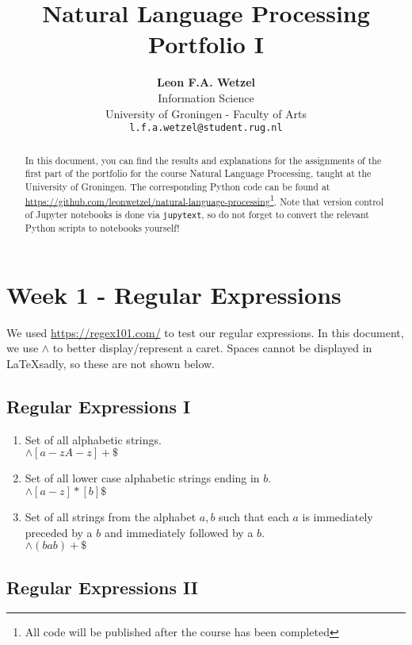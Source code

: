 \documentclass[a4paper, 11pt]{article}
\title{\textbf{Natural Language Processing}\\Portfolio I}
\author{\textbf{Leon F.A. Wetzel}\\ Information Science \\ University of Groningen - Faculty of Arts\\ \texttt{l.f.a.wetzel@student.rug.nl}}
\begin{document}
\maketitle

\begin{abstract}
	
	In this document, you can find the results and explanations for the assignments of the first part of the portfolio for the course Natural Language Processing, taught at the University of Groningen. The corresponding Python code can be found at \url{https://github.com/leonwetzel/natural-language-processing}\footnote{All code will be published after the course has been completed}. Note that version control of Jupyter notebooks is done via \texttt{jupytext}, so do not forget to convert the relevant Python scripts to notebooks yourself!

\end{abstract}

\section{Week 1 - Regular Expressions}

We used \url{https://regex101.com/} to test our regular expressions. In this document, we use \texttt{$\wedge$} to better display/represent a caret. Spaces cannot be displayed in \LaTeX  sadly, so these are not shown below.

\subsection{Regular Expressions I}

\begin{enumerate}
	\item Set of all alphabetic strings. \\ $ \wedge [a-zA-z ]+\$ $
	
	\item Set of all lower case alphabetic strings ending in $b$. \\ $\wedge [a-z ]*[b]\$ $
	
	\item Set of all strings from the alphabet ${a,b}$ such that each $a$ is immediately preceded by a $b$ and immediately followed by a $b$. \\$\wedge(bab)+\$ $
\end{enumerate}

\subsection{Regular Expressions II}
\end{document}
